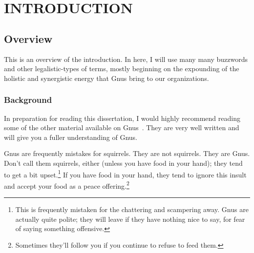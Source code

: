 %
%
%
%
%
%
%
%
%
%


%
%

\chapter{INTRODUCTION}

\section{Overview}

This is an overview of the introduction.  In here, I will use many
many buzzwords and other legalistic-types of terms, mostly beginning on
the expounding of the holistic and synergistic energy that Gnus bring
to our organizations.

\subsection{Background}

In preparation for reading this dissertation, I would highly recommend
reading some of the other material available on
Gnus~\citep{gnus98:_gerry_ganst,greenfield96:_gettin_know_gnu}.  They
are very well written and will give you a fuller understanding of
Gnus.

Gnus are frequently mistakes for squirrels.  They are not squirrels.
They are Gnus.  Don't call them squirrels, either (unless you have
food in your hand); they tend to get a bit upset.\footnote{This is
  frequently mistaken for the chattering and scampering away.  Gnus
  are actually quite polite; they will leave if they have nothing nice
  to say, for fear of saying something offensive.}  If you have food
in your hand, they tend to ignore this insult and accept your food as
a peace offering.\footnote{Sometimes they'll follow you if you continue
to refuse to feed them.}


